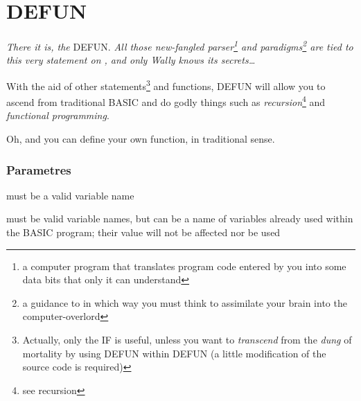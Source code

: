 \section{DEFUN}

\emph{There it is, the} DEFUN. \emph{All those new-fangled parser\footnote{a computer program that translates program code entered by you into some data bits that only it can understand} and paradigms\footnote{a guidance to in which way you must think to assimilate your brain into the computer-overlord} are tied to this very statement on \tbas{}, and only Wally knows its secrets\ldots}


With the aid of other statements\footnote{Actually, only the IF is useful, unless you want to \emph{transcend} from the \emph{dung} of mortality by using DEFUN within DEFUN (a little modification of the source code is required)} and functions, DEFUN will allow you to ascend from traditional BASIC and do godly things such as \emph{recursion}\footnote{see recursion} and \emph{functional programming}.

Oh, and you can define your own function, in traditional  sense.

\subsubsection*{Parametres}

\begin{itemlist}
\item {} must be a valid variable name
\item {} must be valid variable names, but can be a name of variables already used within the BASIC program; their value will not be affected nor be used
\end{itemlist}
